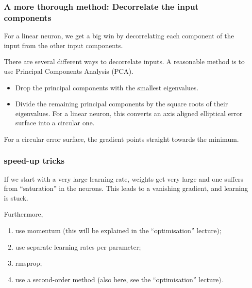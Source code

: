 \documentclass[USenglish,pdftex,compress,10pt,svgnamesi,handout]{beamer}
\begin{document}
\begin{frame}
\frametitle{A more thorough method: Decorrelate the input components}
For a linear neuron, we get a big win by decorrelating each component of the input from the other input components.

There are several different ways to decorrelate inputs. A reasonable method is to use Principal Components Analysis (PCA).
\begin{itemize}
\item  Drop the principal components with the smallest eigenvalues.
\item  Divide the remaining principal components by the square roots of their eigenvalues. For a linear neuron, this converts an axis aligned elliptical error surface into a circular one.
\end{itemize}
For a circular error surface, the gradient points straight towards the minimum.

\end{frame}



\begin{frame}
\frametitle{speed-up tricks}
If we start with a very large learning rate, weights get very large and one suffers from ``saturation'' in the neurons.  This leads to a vanishing gradient, and learning is stuck.

\vskip5mm
Furthermore,
\begin{enumerate}
\item use momentum (this will be explained in the ``optimisation'' lecture);
\item use separate learning rates per parameter;
\item rmsprop;
\item use a second-order method (also here, see the ``optimisation'' lecture).
\end{enumerate}
\end{frame}
\end{document}
